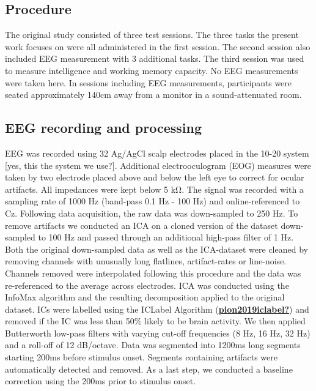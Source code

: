 \documentclass[
  man,floatsintext]{apa7}
\begin{document}
\hypertarget{procedure}{%
\subsection{Procedure}\label{procedure}}

The original study consisted of three test sessions. The three tasks the present work focuses on were all administered in the first session. The second session also included EEG measurement with 3 additional tasks. The third session was used to measure intelligence and working memory capacity. No EEG measurements were taken here. In sessions including EEG measurements, participants were seated approximately 140cm away from a monitor in a sound-attenuated room.

\hypertarget{eeg-recording-and-processing}{%
\subsection{EEG recording and processing}\label{eeg-recording-and-processing}}

EEG was recorded using 32 Ag/AgCl scalp electrodes placed in the 10-20 system {[}yes, this the system we use?{]}. Additional electrooculogram (EOG) measures were taken by two electrode placed above and below the left eye to correct for ocular artifacts. All impedances were kept below 5 kΩ. The signal was recorded with a sampling rate of 1000 Hz (band-pass 0.1 Hz - 100 Hz) and online-referenced to Cz. Following data acquisition, the raw data was down-sampled to 250 Hz. To remove artifacts we conducted an ICA on a cloned version of the dataset down-sampled to 100 Hz and passed through an additional high-pass filter of 1 Hz. Both the original down-sampled data as well as the ICA-dataset were cleaned by removing channels with unusually long flatlines, artifact-rates or line-noise. Channels removed were interpolated following this procedure and the data was re-referenced to the average across electrodes. ICA was conducted using the InfoMax algorithm and the resulting decomposition applied to the original dataset. ICs were labelled using the ICLabel Algorithm (\protect\hyperlink{ref-pion2019iclabel}{\textbf{pion2019iclabel?}}) and removed if the IC was less than 50\% likely to be brain activity. We then applied Butterworth low-pass filters with varying cut-off frequencies (8 Hz, 16 Hz, 32 Hz) and a roll-off of 12 dB/octave. Data was segmented into 1200ms long segments starting 200ms before stimulus onset. Segments containing artifacts were automatically detected and removed. As a last step, we conducted a baseline correction using the 200ms prior to stimulus onset.
\end{document}
